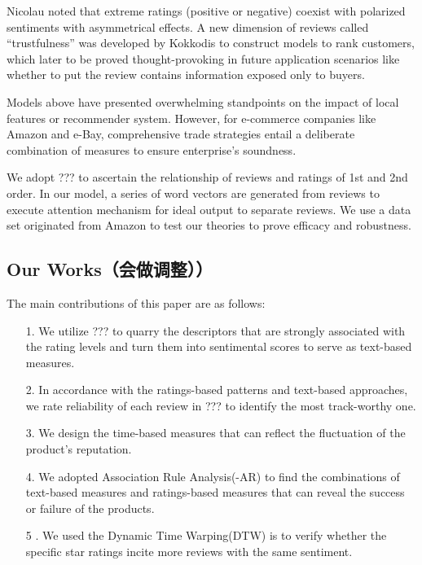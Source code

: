 \documentclass[12pt]{article}%
\begin{document}
Nicolau \cite{233} noted that extreme ratings (positive or negative) coexist with polarized sentiments with asymmetrical effects. A new dimension of reviews called “trustfulness” was developed by Kokkodis \cite{234} to construct models to rank customers, which later to be proved thought-provoking in future application scenarios like whether to put the review contains information exposed only to buyers. 

Models above have presented overwhelming standpoints on the impact of local features or recommender system. However, for e-commerce companies like Amazon and e-Bay, comprehensive trade strategies entail a deliberate combination of measures to ensure enterprise’s soundness.

We adopt ??? to ascertain the relationship of reviews and ratings of 1st and 2nd order. In our model, a series of word vectors are generated from reviews to execute attention mechanism for ideal output to separate reviews. We use a data set originated from Amazon to test our theories to prove efficacy and robustness.
	

\subsection{Our Works（会做调整））}
The main contributions of this paper are as follows:
\begin{itemize} 
	\item [1.] We utilize ??? to quarry the descriptors that are strongly associated with the rating levels and turn them into sentimental scores to serve as text-based measures. 
	\item [2.] In accordance with the ratings-based patterns and text-based approaches, we rate reliability of each review in ??? to identify the most track-worthy one.      
	\item [3.] We design the time-based measures that can reflect the fluctuation of the product’s reputation. 
	\item [4.] We adopted Association Rule Analysis(-AR) to find the combinations of text-based measures and ratings-based measures that can reveal the success or failure of the products.
	\item [5 .]We used the Dynamic Time Warping(DTW) is  to verify whether the specific star ratings incite more reviews with the same sentiment.
\end{itemize}
\end{document}

